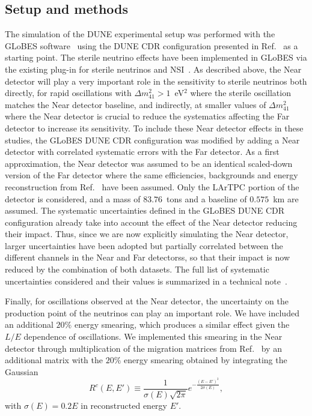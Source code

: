 \subsection{Setup and methods}
The simulation of the DUNE experimental setup was performed with the GLoBES software~\cite{Huber:2004ka,Huber:2007ji} using the DUNE CDR configuration presented in Ref.~\cite{Alion:2016uaj} as a starting point. The sterile neutrino effects have been implemented in GLoBES via the existing plug-in for sterile neutrinos and NSI~\cite{Joachim}. As described above, the Near detector will play a very important role in the sensitivity to sterile neutrinos both directly, for rapid oscillations with $\Delta m_{41}^2 > 1$~eV$^2$ where the sterile oscillation matches the Near detector baseline, and indirectly, at smaller values of $\Delta m_{41}^2$ where the Near detector is crucial to reduce the systematics affecting the Far detector to increase its sensitivity. To include these Near detector effects in these studies, the GLoBES DUNE CDR configuration was modified by adding a Near detector with correlated systematic errors with the Far detector. As a first approximation, the Near detector was assumed to be an identical scaled-down version of the Far detector where the same efficiencies, backgrounds and energy reconstruction from Ref.~\cite{Alion:2016uaj} have been assumed. Only the LArTPC portion of the detector is considered, and a mass of $83.76$~tons and a baseline of $0.575$~km are assumed. The systematic uncertainties defined in the GLoBES DUNE CDR configuration already take into account the effect of the Near detector reducing their impact. Thus, since we are now explicitly simulating the Near detector, larger uncertainties have been adopted but partially correlated between the different channels in the Near and Far detectorss, so that their impact is now reduced by the combination of both datasets. The full list of systematic uncertainties considered and their values is summarized in a technical note~\cite{ref:dune_steril_note}.

Finally, for oscillations observed at the Near detector, the uncertainty on the production point of the neutrinos can play an important role. We have included an additional $20\%$ energy smearing, which produces a similar effect given the $L/E$ dependence of oscillations. We implemented this smearing in the Near detector through multiplication of the migration matrices from Ref.~\cite{Alion:2016uaj} by an additional matrix with the $20\%$ energy smearing obtained by integrating the Gaussian
\begin{equation}
R^c(E,E')\equiv\frac{1}{\sigma(E)\sqrt{2\pi}}e^{-\frac{(E-E')^2}{2\sigma(E)}},
\label{R_mat}
\end{equation}
with $\sigma(E)=0.2 E$ in reconstructed energy $E'$.

